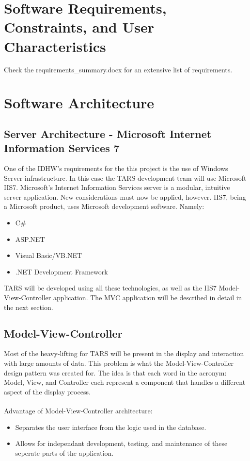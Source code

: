 \documentclass[letterpaper]{article}
\begin{document}
\section{\bfseries{Software Requirements, Constraints, and User Characteristics}}
%
Check the requirements\_summary.docx for an extensive list of requirements.
\section{Software Architecture}
\subsection{Server Architecture - Microsoft Internet Information Services 7} 
One of the IDHW's requirements for the this project is the use of Windows Server infrastructure. In this case the TARS development team will use Microsoft IIS7. Microsoft's Internet Information Services server is a modular, intuitive server application. New considerations must now be applied, however. IIS7, being a Microsoft product, uses Microsoft development software. Namely:
\begin{itemize}
\item C\# 
\item ASP.NET
\item Visual Basic/VB.NET
\item .NET Development Framework
\end{itemize} 
TARS will be developed using all these technologies, as well as the IIS7 Model-View-Controller application. The MVC application will be described in detail in the next section.

\subsection{Model-View-Controller}
Most of the heavy-lifting for TARS will be present in the display and interaction with large amounts of data. This problem is what the Model-View-Controller design pattern was created for. The idea is that each word in the acronym: Model, View, and Controller each represent a component that handles a different aspect of the display process.\\
\\
Advantage of Model-View-Controller architecture:
\begin{itemize}
\item Separates the user interface from the logic used in the database.
\item Allows for independant development, testing, and maintenance of these seperate parts of the application.
\end{itemize}
\end{document}
